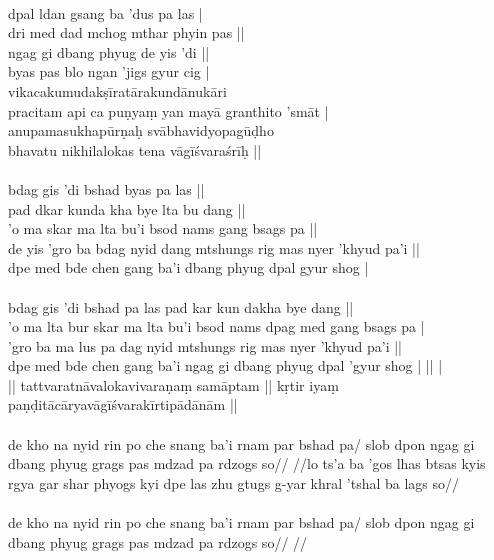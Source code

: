 \documentclass[12pt]{article}
\begin{document}
\textbf{\TVB}\\
dpal ldan gsang ba 'dus pa las | \\
dri med dad mchog mthar phyin pas || \\
ngag gi dbang phyug de yis 'di || \\
byas pas blo ngan 'jigs gyur cig  |\\

vikacakumudakṣīratārakundānukāri\\
pracitam api ca puṇyaṃ yan mayā granthito 'smāt |\\
anupamasukhapūrṇaḥ svābhavidyopagūḍho\\
bhavatu nikhilalokas tena vāgīśvaraśrīḥ ||\\

\textbf{\TVA}\\
bdag gis 'di bshad byas pa las || \\
pad dkar kunda kha bye lta bu dang || \\
'o ma skar ma lta bu'i bsod nams gang bsags pa || \\
de yis 'gro ba bdag nyid dang mtshungs rig mas nyer 'khyud pa'i || \\
dpe med bde chen gang ba'i dbang phyug dpal gyur shog  |\\

\textbf{\TVB}\\
bdag gis 'di bshad pa las pad kar kun dakha bye dang || \\
'o ma lta bur skar ma lta bu'i bsod nams dpag med gang bsags pa | \\
'gro ba ma lus pa dag nyid mtshungs rig mas nyer 'khyud pa'i || \\
dpe med bde chen gang ba'i ngag gi dbang phyug dpal 'gyur shog | ||  |\\

|| tattvaratnāvalokavivaraṇaṃ samāptam || kṛtir iyaṃ paṇḍitācāryavāgīśvarakīrtipādānām ||\\

\textbf{\TVA}\\
de kho na nyid rin po che snang ba'i rnam par bshad pa/ slob dpon ngag gi dbang phyug grags pas mdzad pa rdzogs so// //lo ts'a ba 'gos lhas btsas kyis rgya gar shar phyogs kyi dpe las zhu gtugs g-yar khral 'tshal ba lags so//\\

\textbf{\TVB}\\
de kho na nyid rin po che snang ba'i rnam par bshad pa/ slob dpon ngag gi dbang phyug grags pas mdzad pa rdzogs so// //
\end{document}
